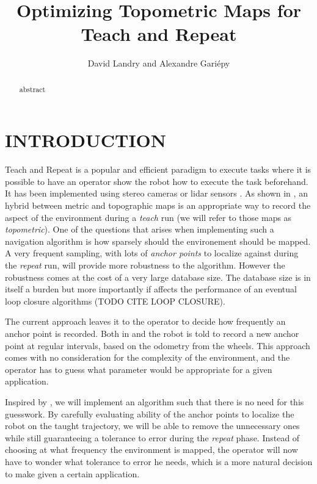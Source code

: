 \documentclass[letterpaper,10 pt,conference]{ieeeconf}
\title{\LARGE \bf
  Optimizing Topometric Maps for Teach and Repeat
}
\author{David Landry and Alexandre Gari\'epy}
\begin{document}
\maketitle
\thispagestyle{empty}
\pagestyle{empty}


\begin{abstract}

  abstract

\end{abstract}

\section{INTRODUCTION}

Teach and Repeat is a popular and efficient paradigm to execute tasks where it is possible to have
an operator show the robot how to execute the task beforehand. It has been implemented using stereo
cameras \cite{Furgale10} or lidar sensors \cite{Sprunk13}. As shown in \cite{Furgale10}, an hybrid
between metric and topographic maps is an appropriate way to record the aspect of the environment
during a \textit{teach} run (we will refer to those maps as \textit{topometric}). One of the
questions that arises when implementing such a navigation algorithm is how sparsely should the
environement should be mapped. A very frequent sampling, with lots of \textit{anchor points} to
localize against during the \textit{repeat} run, will provide more robustness to the
algorithm. However the robustness comes at the cost of a very large database size. The database size
is in itself a burden but more importantly if affects the performance of an eventual loop closure
algorithms (TODO CITE LOOP CLOSURE).

The current approach leaves it to the operator to decide how frequently an anchor point is
recorded. Both in \cite{Furgale10} and \cite{Sprunk13} the robot is told to record a new anchor
point at regular intervals, based on the odometry from the wheels. This approach comes with no
consideration for the complexity of the environment, and the operator has to guess what parameter
would be appropriate for a given application.

Inspired by \cite{Churchill15}, we will implement an algorithm such that there is no need for this
guesswork. By carefully evaluating ability of the anchor points to localize the robot on the taught
trajectory, we will be able to remove the unnecessary ones while still guaranteeing a tolerance to
error during the \textit{repeat} phase. Instead of choosing at what frequency the environment is
mapped, the operator will now have to wonder what tolerance to error he needs, which is a more
natural decision to make given a certain application.
\end{document}
